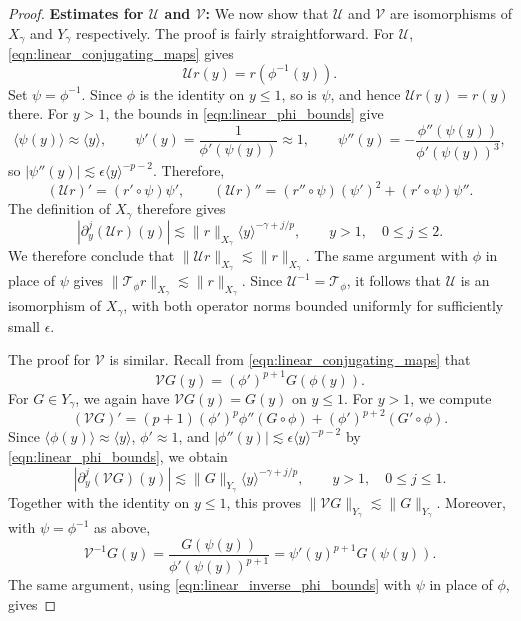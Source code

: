 \documentclass[11pt]{amsart}
\theoremstyle{definition}
\theoremstyle{remark}
\numberwithin{equation}{section}
\newcommand{\mc}[1]{\mathcal{#1}}
\newcommand{\ang}[1]{\langle #1 \rangle}
\begin{document}
\begin{proof}
    \textbf{Estimates for $\mc{U}$ and $\mc{V}$:} We now show that $\mc{U}$ and $\mc{V}$ are isomorphisms of $X_\gamma$ and $Y_\gamma$ respectively.  The proof is fairly straightforward. For $\mc{U}$, \eqref{eqn:linear_conjugating_maps} gives 
    \[\mc{U}r(y) = r(\phi^{-1}(y)).\]
    Set $\psi=\phi^{-1}$. Since $\phi$ is the identity on $y\le1$,
    so is $\psi$, and hence $\mc{U}r(y)=r(y)$ there. For $y>1$,
    the bounds in \eqref{eqn:linear_phi_bounds} give
    \begin{equation}\label{eqn:linear_inverse_phi_bounds}
        \ang{\psi(y)}\approx\ang{y},
        \qquad \psi'(y)=\frac{1}{\phi'(\psi(y))}\approx1,
        \qquad
        \psi''(y)=-\frac{\phi''(\psi(y))}{\phi'(\psi(y))^3},
    \end{equation}
    so $|\psi''(y)|\lesssim\epsilon\ang{y}^{-p-2}$.
    Therefore,
    \[
        (\mc{U}r)'=(r'\circ\psi)\psi',
        \qquad
        (\mc{U}r)''=(r''\circ\psi)(\psi')^2+(r'\circ\psi)\psi''.
    \]
    The definition of $X_\gamma$ therefore gives
    \[
        |\partial_y^j(\mc{U}r)(y)|
        \lesssim\|r\|_{X_\gamma}\ang{y}^{-\gamma+j/p},
        \qquad y>1,\quad 0\le j\le2.
    \]
    We therefore conclude that
    $\|\mc{U}r\|_{X_\gamma}\lesssim\|r\|_{X_\gamma}$.
    The same argument with $\phi$ in place of $\psi$ gives
    $\|\mc{T}_\phi r\|_{X_\gamma}\lesssim\|r\|_{X_\gamma}$.
    Since $\mc{U}^{-1}=\mc{T}_\phi$, it follows that $\mc{U}$ is an
    isomorphism of $X_\gamma$, with both operator norms bounded
    uniformly for sufficiently small $\epsilon$. \par
    The proof for $\mc{V}$ is similar. Recall from \eqref{eqn:linear_conjugating_maps} that 
    \[\mc{V}G(y) = (\phi')^{p + 1} G(\phi(y)).\]
    For $G\in Y_\gamma$, we again have $\mc{V}G(y)=G(y)$ on $y\le1$.
    For $y>1$, we compute
    \[
        (\mc{V}G)'
        =(p+1)(\phi')^p\phi''(G\circ\phi)
        +(\phi')^{p+2}(G'\circ\phi).
    \]
    Since $\ang{\phi(y)}\approx\ang{y}$, $\phi'\approx1$, and
    $|\phi''(y)|\lesssim\epsilon\ang{y}^{-p-2}$ by \eqref{eqn:linear_phi_bounds}, we obtain
    \[
        |\partial_y^j(\mc{V}G)(y)|
        \lesssim\|G\|_{Y_\gamma}\ang{y}^{-\gamma+j/p},
        \qquad y>1,\quad 0\le j\le1.
    \]
    Together with the identity on $y\le1$, this proves
    $\|\mc{V}G\|_{Y_\gamma}\lesssim\|G\|_{Y_\gamma}$.
    Moreover, with $\psi=\phi^{-1}$ as above,
    \[
        \mc{V}^{-1}G(y)
        =\frac{G(\psi(y))}{\phi'(\psi(y))^{p+1}}
        =\psi'(y)^{p+1}G(\psi(y)).
    \]
    The same argument, using \eqref{eqn:linear_inverse_phi_bounds} with $\psi$ in place of $\phi$, gives

\end{proof}
\end{document}
